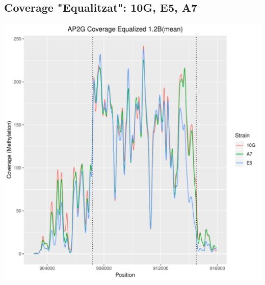 \documentclass{article}\usepackage[]{graphicx}\usepackage[]{color}
\newenvironment{knitrout}{}{} %
\begin{document}
\subsection{Coverage "Equalitzat": 10G, E5, A7}
\begin{knitrout}
\color{fgcolor}
\includegraphics[width=1\linewidth]{figure/plot_equalizedCov_3sample-1} 

\end{knitrout}
\clearpage
\end{document}
